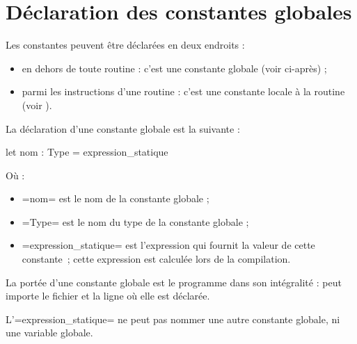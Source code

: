 




\chapter{Déclaration des constantes globales}

Les constantes peuvent être déclarées en deux endroits :
\begin{itemize}
  \item en dehors de toute routine : c'est une constante globale (voir ci-après) ;
  \item parmi les instructions d'une routine : c'est une constante locale à la routine (voir ).
\end{itemize}





La déclaration d'une constante globale est la suivante :

\begin{OMNIBUS}
let nom : Type = expression_statique
\end{OMNIBUS}

Où :
\begin{itemize}
  \item \omnibus=nom= est le nom de la constante globale ;
  \item \omnibus=Type= est le nom du type de la constante globale ;
  \item \omnibus=expression_statique= est l'expression qui fournit la valeur de cette constante~; cette expression est calculée lors de la compilation.
\end{itemize}

La portée d'une constante globale est le programme dans son intégralité : peut importe le fichier et la ligne où elle est déclarée.

L'\omnibus=expression_statique= ne peut pas nommer une autre constante globale, ni une variable globale.

